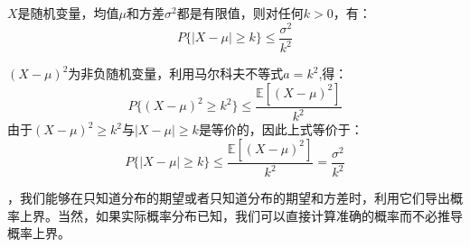 \documentclass[UTF8]{article}
\begin{document}
\(X\)是随机变量，均值\(\mu\)和方差\(\sigma^{2}\)都是有限值，则对任何\(k > 0\)，有：
\begin{equation}
\label{eq:5}
P\{| X - \mu| \geq k\} \leq \frac{\sigma^{2}}{k^{2}}
\end{equation}
\begin{shaded}  
\((X-\mu)^{2}\)为非负随机变量，利用马尔科夫不等式\(a=k^{2}\),得：
\begin{equation}
\label{eq:6}
P\{ (X-\mu)^{2} \geq k^{2} \} \leq \frac{\mathbb{E}[ (X-\mu)^{2} ]}{k^{2}}
\end{equation}
由于\((X-\mu)^{2} \geq k^{2}\)与\( |X-\mu| \geq k \)是等价的，因此上式等价于：
\begin{equation}
\label{eq:7}
P\{ |X - \mu| \geq k \} \leq \frac{\mathbb{E}[(X-\mu)^{2}]}{k^{2}} = \frac{\sigma^{2}}{k^{2}}
\end{equation}
\end{shaded}
，我们能够在只知道分布的期望或者只知道分布的期望和方差时，利用它们导出概率上界。当然，如果实际概率分布已知，我们可以直接计算准确的概率而不必推导概率上界。
\end{document}
